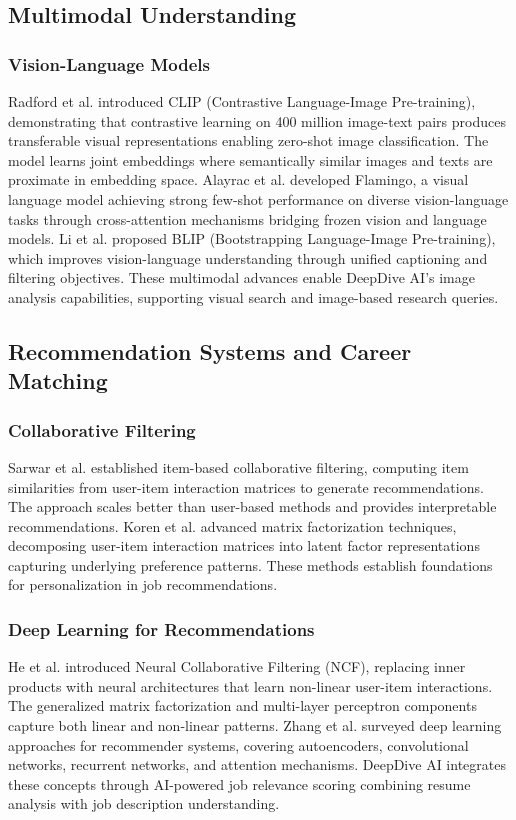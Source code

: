 \documentclass[conference]{IEEEtran}
\begin{document}
\subsection{Multimodal Understanding}

\subsubsection{Vision-Language Models}
Radford et al. \cite{ref9} introduced CLIP (Contrastive Language-Image Pre-training), demonstrating that contrastive learning on 400 million image-text pairs produces transferable visual representations enabling zero-shot image classification. The model learns joint embeddings where semantically similar images and texts are proximate in embedding space. Alayrac et al. \cite{ref10} developed Flamingo, a visual language model achieving strong few-shot performance on diverse vision-language tasks through cross-attention mechanisms bridging frozen vision and language models. Li et al. \cite{ref33} proposed BLIP (Bootstrapping Language-Image Pre-training), which improves vision-language understanding through unified captioning and filtering objectives. These multimodal advances enable DeepDive AI's image analysis capabilities, supporting visual search and image-based research queries.

\subsection{Recommendation Systems and Career Matching}

\subsubsection{Collaborative Filtering}
Sarwar et al. \cite{ref11} established item-based collaborative filtering, computing item similarities from user-item interaction matrices to generate recommendations. The approach scales better than user-based methods and provides interpretable recommendations. Koren et al. \cite{ref34} advanced matrix factorization techniques, decomposing user-item interaction matrices into latent factor representations capturing underlying preference patterns. These methods establish foundations for personalization in job recommendations.

\subsubsection{Deep Learning for Recommendations}
He et al. \cite{ref12} introduced Neural Collaborative Filtering (NCF), replacing inner products with neural architectures that learn non-linear user-item interactions. The generalized matrix factorization and multi-layer perceptron components capture both linear and non-linear patterns. Zhang et al. \cite{ref35} surveyed deep learning approaches for recommender systems, covering autoencoders, convolutional networks, recurrent networks, and attention mechanisms. DeepDive AI integrates these concepts through AI-powered job relevance scoring combining resume analysis with job description understanding.
\end{document}
